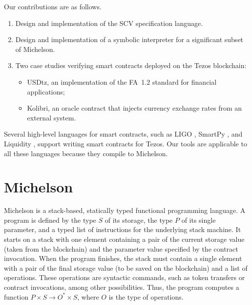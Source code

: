 \documentclass[runningheads]{llncs}
\begin{document}
Our contributions are as follows.
\begin{enumerate}
\item Design and implementation of the SCV specification language.
\item Design and implementation of a symbolic interpreter for a significant subset of Michelson. 
\item Two case studies verifying smart contracts deployed on the Tezos blockchain:
  \begin{itemize}
  \item USDtz, an implementation of the FA~1.2 standard for financial applications;
  \item Kolibri, an oracle contract that injects currency exchange rates from an external system.
  \end{itemize}
\end{enumerate}

Several high-level languages for smart contracts, such as LIGO
\cite{ligo}, SmartPy \cite{smartpy}, and Liquidity \cite{liquidity},
support writing smart contracts for Tezos. Our tools
are applicable to all these languages because they compile to
Michelson. 
\section{Michelson}
\label{sec:background}
Michelson is a stack-based, statically typed functional programming language. A program is defined by the type $S$ of its storage, the type $P$ of its single parameter, and a typed list of instructions for the underlying stack machine. It starts on a stack with one element containing a pair of the current storage value (taken from the blockchain) and the parameter value specified by the contract invocation. When the program finishes, the stack must contain a single element with a pair of the final storage value (to be saved on the blockchain) and a list of operations. These operations are syntactic commands, such as token transfers or contract invocations, among other possibilities. Thus, the program computes a function $P \times S \to O^* \times S$, where $O$ is the type of operations.
\end{document}
